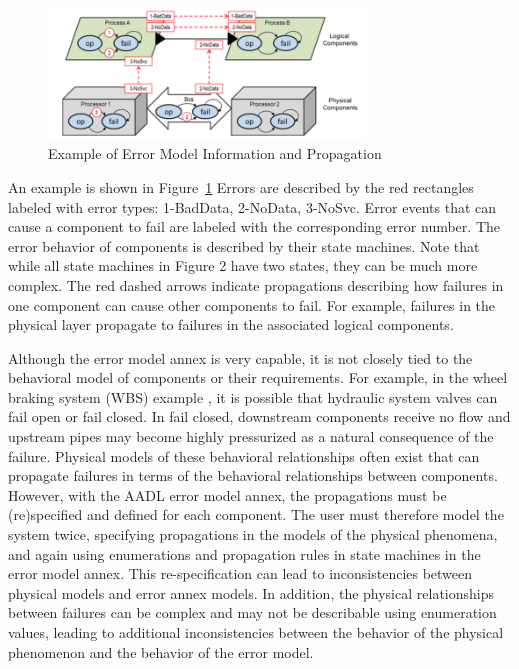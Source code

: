 \begin{figure}
  \centering
 \includegraphics[width=0.75\textwidth]{images/error_annex.png}
  \vspace{-0.1in}
  \caption{Example of Error Model Information and Propagation}
  \label{fig:error_annex}
\end{figure}

An example is shown in Figure~\ref{fig:error_annex} 
Errors are described by the red rectangles labeled with error types: 1-BadData, 2-NoData, 3-NoSvc. Error events that can cause a component to fail are labeled with the corresponding error number. The error behavior of components is described by their state machines. Note that while all state machines in Figure 2 have two states, they can be much more complex. The red dashed arrows indicate propagations describing how failures in one component can cause other components to fail. For example, failures in the physical layer propagate to failures in the associated logical components.

Although the error model annex is very capable, it is not closely tied to the behavioral model of components or their requirements. For example, in the wheel braking system (WBS) example \cite{SAE:ARP4761}, it is possible that hydraulic system valves can fail open or fail closed. In fail closed, downstream components receive no flow and upstream pipes may become highly pressurized as a natural consequence of the failure. Physical models of these behavioral relationships often exist that can propagate failures in terms of the behavioral relationships between components. However, with the AADL error model annex, the propagations must be (re)specified and defined for each component. The user must therefore model the system twice, specifying propagations in the models of the physical phenomena, and again using enumerations and propagation rules in state machines in the error model annex. This re-specification can lead to inconsistencies between physical models and error annex models. In addition, the physical relationships between failures can be complex and may not be describable using enumeration values, leading to additional inconsistencies between the behavior of the physical phenomenon and the behavior of the error model.

